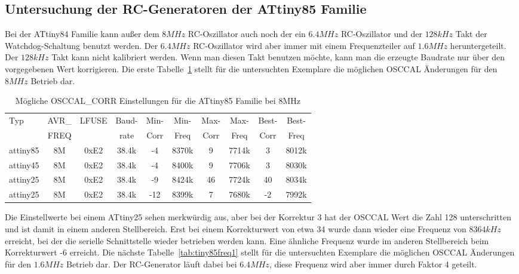 \subsection{Untersuchung der RC-Generatoren der ATtiny85 Familie}

Bei der ATtiny84 Familie kann außer dem \(8MHz\) RC-Oszillator auch noch der 
ein \(6.4MHz\) RC-Oszillator und der \(128kHz\) Takt der Watchdog-Schaltung benutzt werden.
Der \(6.4MHz\) RC-Oszillator wird aber immer mit einem Frequenzteiler auf \(1.6MHz\)
heruntergeteilt.
Der \(128kHz\) Takt kann nicht kalibriert werden. Wenn man diesen Takt benutzen möchte,
kann man die erzeugte Baudrate nur über den vorgegebenen Wert korrigieren.
Die erste Tabelle~\ref{tab:tiny85freq8} stellt für die untersuchten Exemplare die möglichen
OSCCAL Änderungen für den \(8MHz\) Betrieb dar.

\begin{table}[H]
  \begin{center}
    \begin{tabular}{| l | c | c | c || c | c || c | c || c | c |}
    \hline
   Typ  &       AVR\_ & LFUSE & Baud- & Min- & Min- & Max- & Max- & Best- & Best-  \\
        &       FREQ  &       & rate & Corr & Freq & Corr & Freq  & Corr  & Freq  \\
    \hline
    \hline
attiny85 &          8M & 0xE2  & 38.4k &  -4  & 8370k &  9  & 7714k  & 3  & 8012k \\
    \hline
attiny45  &         8M & 0xE2  & 38.4k &  -4  & 8400k & 9  & 7706k  & 3  & 8030k \\
    \hline
attiny25  &         8M & 0xE2  & 38.4k &  -9  & 8424k & 46  & 7724k  & 40  & 8034k \\
attiny25  &         8M & 0xE2  & 38.4k &  -12  & 8399k & 7  & 7680k  & -2  & 7992k \\
    \hline
    \end{tabular}
  \end{center}
  \caption{Mögliche OSCCAL\_CORR Einstellungen für die ATtiny85 Familie bei 8MHz}
  \label{tab:tiny85freq8}
\end{table}

Die Einstellwerte bei einem ATtiny25 sehen merkwürdig aus, aber bei der Korrektur 3 hat
der OSCCAL Wert die Zahl 128 unterschritten und ist damit in einem anderen Stellbereich.
Erst bei einem Korrekturwert von etwa 34 wurde dann wieder eine Frequenz von \(8364kHz\)
erreicht, bei der die serielle Schnittstelle wieder betrieben werden kann. Eine ähnliche
Frequenz wurde im anderen Stellbereich beim Korrekturwert -6 erreicht.
Die nächste Tabelle~\ref{tab:tiny85freq1} stellt für die untersuchten Exemplare die möglichen
OSCCAL Änderungen für den \(1.6MHz\) Betrieb dar. Der RC-Generator läuft dabei bei \(6.4MHz\),
diese Frequenz wird aber immer durch Faktor 4 geteilt. 

